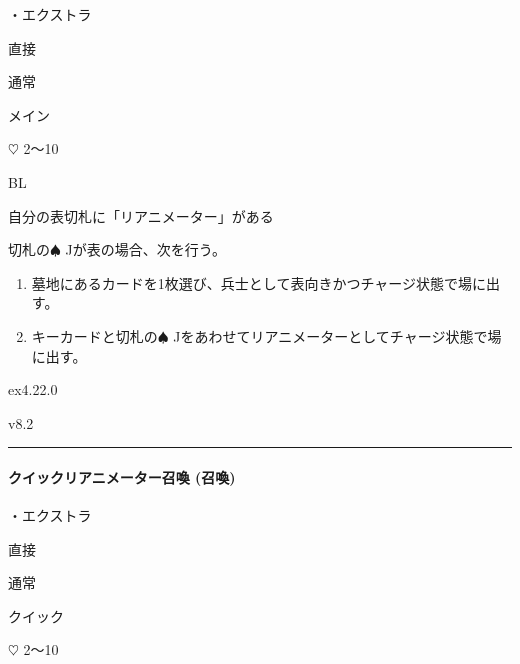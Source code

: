 \documentclass[letterpaper,10pt,dvipdfmx]{sphinxmanual}
\begin{document}
\sphinxAtStartPar
・エクストラ

\sphinxAtStartPar
{} 直接

\sphinxAtStartPar
{} 通常

\sphinxAtStartPar
{} メイン

\sphinxAtStartPar
{} {\normalsize $\heartsuit$} 2〜10

\sphinxAtStartPar
{} BL

\sphinxAtStartPar
{}

\sphinxAtStartPar
自分の表切札に「リアニメーター」がある

\sphinxAtStartPar
{}

\sphinxAtStartPar
切札の{\normalsize $\spadesuit$} Jが表の場合、次を行う。
\begin{enumerate}
%
\item {} 
\sphinxAtStartPar
墓地にあるカードを1枚選び、兵士として表向きかつチャージ状態で場に出す。

\item {} 
\sphinxAtStartPar
キーカードと切札の{\normalsize $\spadesuit$} Jをあわせてリアニメーターとしてチャージ状態で場に出す。

\end{enumerate}

\sphinxAtStartPar
{}  ex4.22.0

\sphinxAtStartPar
{}  v8.2


\bigskip\hrule\bigskip



\paragraph{クイックリアニメーター召喚 (召喚)}
\label{\detokenize{auto/frameActionlist:act-quicksummonreanimator}}\label{\detokenize{auto/frameActionlist:id27}}
\sphinxAtStartPar
{}

\sphinxAtStartPar
・エクストラ

\sphinxAtStartPar
{} 直接

\sphinxAtStartPar
{} 通常

\sphinxAtStartPar
{} クイック

\sphinxAtStartPar
{} {\normalsize $\heartsuit$} 2〜10
\end{document}
